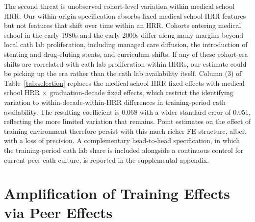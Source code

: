 \documentclass[12pt]{article}
\begin{document}
The second threat is unobserved cohort-level variation within medical school HRR. Our within-origin specification absorbs fixed medical school HRR features but not features that shift over time within an HRR. Cohorts entering medical school in the early 1980s and the early 2000s differ along many margins beyond local cath lab proliferation, including managed care diffusion, the introduction of stenting and drug-eluting stents, and curriculum shifts. If any of these cohort-era shifts are correlated with cath lab proliferation within HRRs, our estimate could be picking up the era rather than the cath lab availability itself. Column (3) of Table~\ref{tab:selection} replaces the medical school HRR fixed effects with medical school HRR $\times$ graduation-decade fixed effects, which restrict the identifying variation to within-decade-within-HRR differences in training-period cath availability. The resulting coefficient is 0.068 with a wider standard error of 0.051, reflecting the more limited variation that remains. Point estimates on the effect of training environment therefore persist with this much richer FE structure, albeit with a loss of precision. A complementary head-to-head specification, in which the training-period cath lab share is included alongside a continuous control for current peer cath culture, is reported in the supplemental appendix.

\section{Amplification of Training Effects via Peer Effects}\label{sec:dest}
\end{document}
